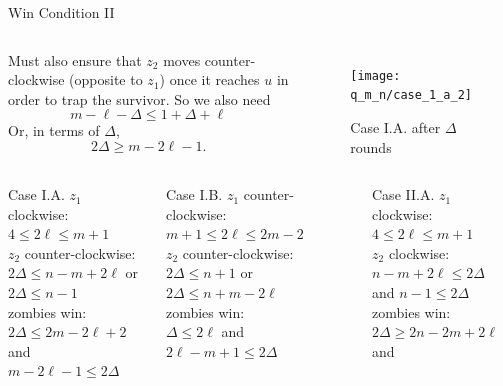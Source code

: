 \begin{frame}{Win Condition II}
\begin{columns}
Must also ensure that $z_2$ moves counter-clockwise (opposite to $z_1$) once it reaches $u$ in order to trap the survivor. So we also need
\[ m - \ell - \Delta \leq 1 + \Delta + \ell \]
Or, in terms of $\Delta$,
\[ 2 \Delta \geq m - 2\ell  -1 . \]

\begin{figure}
\texttt{[image: q\_m\_n/case\_1\_a\_2]}
\caption{Case I.A. after $\Delta$ rounds}
\end{figure}
\end{columns}

\end{frame}

\begin{frame}
\begin{columns}[T]
\begin{block}{Case I.A.}
$z_1$ clockwise: $4 \leq 2 \ell \leq m + 1$ \\
$z_2$ counter-clockwise: \\
$2 \Delta \leq n - m + 2\ell$ or $2 \Delta \leq n - 1$ \\
zombies win: \\
$2 \Delta \leq 2 m- 2 \ell + 2$ and \\
$m - 2\ell  -1 \leq 2 \Delta$ \\
\end{block}
\vfill
\begin{block}{Case I.B.}
$z_1$ counter-clockwise: $ m + 1 \leq 2 \ell \leq 2m - 2 $ \\
$z_2$ counter-clockwise: \\
$ 2 \Delta \leq n + 1$ or $2 \Delta \leq n + m - 2\ell$ \\
zombies win: \\
$ \Delta \leq 2 \ell$ and \\
$2\ell - m + 1 \leq 2 \Delta$ \\
\end{block}
\begin{block}{Case II.A.}
$z_1$ clockwise: $ 4 \leq 2 \ell \leq m + 1$ \\
$z_2$ clockwise: \\
$ n -m + 2\ell \leq 2 \Delta$ and $n-1 \leq 2 \Delta$ \\
zombies win: \\
$2 \Delta \geq 2n - 2m + 2\ell$ and \\

\end{block}
\end{columns}
\end{frame}
